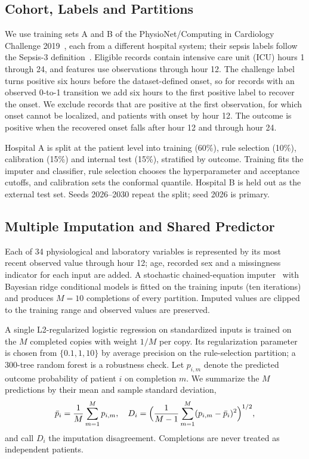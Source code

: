\documentclass[conference]{IEEEtran}
\newcommand{\pmean}{\bar{p}}
\begin{document}
\subsection{Cohort, Labels and Partitions}
We use training sets A and B of the PhysioNet/Computing in Cardiology Challenge 2019~\cite{reyna2020early,goldberger2000physiobank}, each from a different hospital system; their sepsis labels follow the Sepsis-3 definition~\cite{singer2016sepsis3}. Eligible records contain intensive care unit (ICU) hours 1 through 24, and features use observations through hour 12. The challenge label turns positive six hours before the dataset-defined onset, so for records with an observed 0-to-1 transition we add six hours to the first positive label to recover the onset. We exclude records that are positive at the first observation, for which onset cannot be localized, and patients with onset by hour 12. The outcome is positive when the recovered onset falls after hour 12 and through hour 24.

Hospital A is split at the patient level into training (60\%), rule selection (10\%), calibration (15\%) and internal test (15\%), stratified by outcome. Training fits the imputer and classifier, rule selection chooses the hyperparameter and acceptance cutoffs, and calibration sets the conformal quantile. Hospital B is held out as the external test set. Seeds 2026--2030 repeat the split; seed 2026 is primary.

\subsection{Multiple Imputation and Shared Predictor}
Each of 34 physiological and laboratory variables is represented by its most recent observed value through hour 12; age, recorded sex and a missingness indicator for each input are added. A stochastic chained-equation imputer~\cite{vanbuuren2011mice} with Bayesian ridge conditional models is fitted on the training inputs (ten iterations) and produces $M=10$ completions of every partition. Imputed values are clipped to the training range and observed values are preserved.

A single L2-regularized logistic regression on standardized inputs is trained on the $M$ completed copies with weight $1/M$ per copy. Its regularization parameter is chosen from $\{0.1, 1, 10\}$ by average precision on the rule-selection partition; a 300-tree random forest is a robustness check. Let $p_{i,m}$ denote the predicted outcome probability of patient $i$ on completion $m$. We summarize the $M$ predictions by their mean and sample standard deviation,
\begin{equation}
\pmean_i=\frac{1}{M}\sum_{m=1}^{M}p_{i,m},\quad
D_i=\Bigl(\frac{1}{M-1}\sum_{m=1}^{M}(p_{i,m}-\pmean_i)^2\Bigr)^{1/2},
\label{eq:summary}
\end{equation}
and call $D_i$ the imputation disagreement. Completions are never treated as independent patients.
\end{document}
